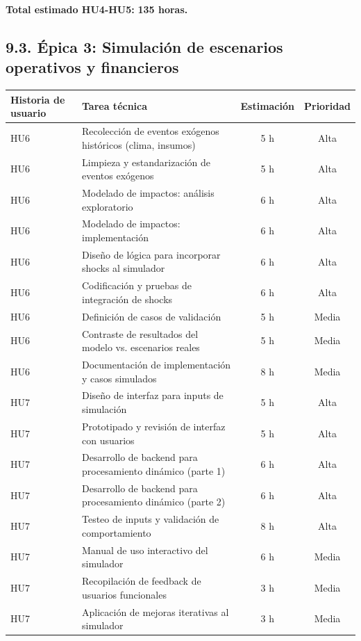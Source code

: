 \documentclass[
11pt, %
]{charter}
\begin{document}
\vspace{0.2cm}
\noindent
\textbf{Total estimado HU4-HU5:} \textbf{135 horas.}

\subsection*{9.3. Épica 3: Simulación de escenarios operativos y financieros}

\begin{table}[H]
\centering
\begin{tabular}{|l|p{6cm}|c|c|}
\hline
\textbf{Historia de usuario} & \textbf{Tarea técnica} & \textbf{Estimación} & \textbf{Prioridad} \\
\hline
HU6 & Recolección de eventos exógenos históricos (clima, insumos) & 5 h & Alta \\
HU6 & Limpieza y estandarización de eventos exógenos & 5 h & Alta \\
HU6 & Modelado de impactos: análisis exploratorio & 6 h & Alta \\
HU6 & Modelado de impactos: implementación & 6 h & Alta \\
HU6 & Diseño de lógica para incorporar shocks al simulador & 6 h & Alta \\
HU6 & Codificación y pruebas de integración de shocks & 6 h & Alta \\
HU6 & Definición de casos de validación & 5 h & Media \\
HU6 & Contraste de resultados del modelo vs. escenarios reales & 5 h & Media \\
HU6 & Documentación de implementación y casos simulados & 8 h & Media \\
\hline
HU7 & Diseño de interfaz para inputs de simulación & 5 h & Alta \\
HU7 & Prototipado y revisión de interfaz con usuarios & 5 h & Alta \\
HU7 & Desarrollo de backend para procesamiento dinámico (parte 1) & 6 h & Alta \\
HU7 & Desarrollo de backend para procesamiento dinámico (parte 2) & 6 h & Alta \\
HU7 & Testeo de inputs y validación de comportamiento & 8 h & Alta \\
HU7 & Manual de uso interactivo del simulador & 6 h & Media \\
HU7 & Recopilación de feedback de usuarios funcionales & 3 h & Media \\
HU7 & Aplicación de mejoras iterativas al simulador & 3 h & Media \\

\end{tabular}
\end{table}
\end{document}
